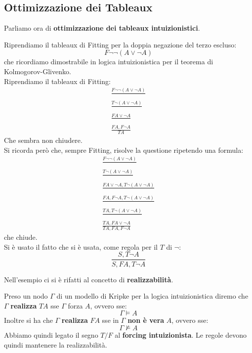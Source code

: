 \documentclass[a4paper,12pt, oneside]{book}
\begin{document}
\subsection{Ottimizzazione dei Tableaux}
Parliamo ora di \textbf{ottimizzazione dei tableaux intuizionistici}.\\
\begin{esempio}
  Riprendiamo il tableaux di Fitting per la doppia negazione del terzo escluso:
  \[F\neg \neg (A\lor \neg A)\]
  che ricordiamo dimostrabile in logica intuizionistica per il teorema di
  Kolmogorov-Glivenko. \\
  Riprendiamo il tableaux di Fitting:
  \begin{gather*}
    \frac{F\neg \neg (A\lor \neg A)}{}\\
    \frac{T\neg(A\lor \neg A)}{}\\
    \frac{FA\lor \neg A}{}\\
    \frac{FA,F\neg A}{TA}
  \end{gather*}
  Che sembra non chiudere. \\
  Si ricorda però che, sempre Fitting, risolve la questione ripetendo una
  formula: 
  \begin{gather*}
    \frac{F\neg \neg (A\lor \neg A)}{}\\
    \frac{T\neg(A\lor \neg A)}{}\\
    \frac{FA\lor \neg A, T\neg(A\lor \neg A)}{}\\
    \frac{FA,F\neg A,T\neg(A\lor \neg A)}{}\\
    \frac{TA,T\neg(A\lor \neg A)}{}\\
    \frac{TA, FA\lor \neg A}{TA, FA, F\neg A}
  \end{gather*}
  che chiude.\\
  Si è usato il fatto che si è usata, come regola per il $T$ di $\neg$:
  \[\frac{S, T\neg A}{S, FA, T\neg A}\]
\end{esempio}
Nell'esempio ci si è rifatti al concetto di \textbf{realizzabilità}.
\begin{definizione}
  Preso un nodo $\Gamma$ di un modello di Kripke per la logica intuizionistica
  diremo che $\Gamma$ \textbf{realizza} $TA$ sse $\Gamma$ \textup{forza} $A$,
  ovvero sse: 
  \[\Gamma\vDash A\]
  Inoltre si ha che $\Gamma$ \textbf{realizza} $FA$ sse in $\Gamma$ \textbf{non
    è vera} $A$, ovvero sse:
  \[\Gamma\nvDash A\]
  Abbiamo quindi legato il segno $T/F$ al \textbf{forcing intuizionista}. Le
  regole devono quindi mantenere la realizzabilità.
\end{definizione}
\end{document}
